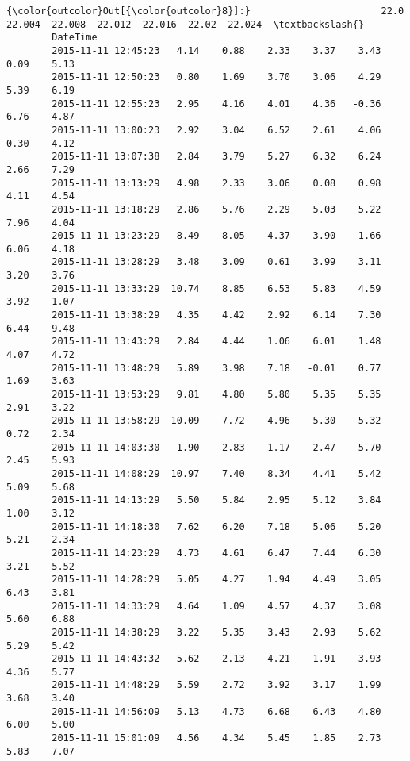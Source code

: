 \documentclass[a4paper,dvipdfmx]{jsarticle}
\begin{document}
            \begin{Verbatim}[commandchars=\\\{\}]
{\color{outcolor}Out[{\color{outcolor}8}]:}                       22.0  22.004  22.008  22.012  22.016  22.02  22.024  \textbackslash{}
        DateTime                                                                    
        2015-11-11 12:45:23   4.14    0.88    2.33    3.37    3.43   0.09    5.13   
        2015-11-11 12:50:23   0.80    1.69    3.70    3.06    4.29   5.39    6.19   
        2015-11-11 12:55:23   2.95    4.16    4.01    4.36   -0.36   6.76    4.87   
        2015-11-11 13:00:23   2.92    3.04    6.52    2.61    4.06   0.30    4.12   
        2015-11-11 13:07:38   2.84    3.79    5.27    6.32    6.24   2.66    7.29   
        2015-11-11 13:13:29   4.98    2.33    3.06    0.08    0.98   4.11    4.54   
        2015-11-11 13:18:29   2.86    5.76    2.29    5.03    5.22   7.96    4.04   
        2015-11-11 13:23:29   8.49    8.05    4.37    3.90    1.66   6.06    4.18   
        2015-11-11 13:28:29   3.48    3.09    0.61    3.99    3.11   3.20    3.76   
        2015-11-11 13:33:29  10.74    8.85    6.53    5.83    4.59   3.92    1.07   
        2015-11-11 13:38:29   4.35    4.42    2.92    6.14    7.30   6.44    9.48   
        2015-11-11 13:43:29   2.84    4.44    1.06    6.01    1.48   4.07    4.72   
        2015-11-11 13:48:29   5.89    3.98    7.18   -0.01    0.77   1.69    3.63   
        2015-11-11 13:53:29   9.81    4.80    5.80    5.35    5.35   2.91    3.22   
        2015-11-11 13:58:29  10.09    7.72    4.96    5.30    5.32   0.72    2.34   
        2015-11-11 14:03:30   1.90    2.83    1.17    2.47    5.70   2.45    5.93   
        2015-11-11 14:08:29  10.97    7.40    8.34    4.41    5.42   5.09    5.68   
        2015-11-11 14:13:29   5.50    5.84    2.95    5.12    3.84   1.00    3.12   
        2015-11-11 14:18:30   7.62    6.20    7.18    5.06    5.20   5.21    2.34   
        2015-11-11 14:23:29   4.73    4.61    6.47    7.44    6.30   3.21    5.52   
        2015-11-11 14:28:29   5.05    4.27    1.94    4.49    3.05   6.43    3.81   
        2015-11-11 14:33:29   4.64    1.09    4.57    4.37    3.08   5.60    6.88   
        2015-11-11 14:38:29   3.22    5.35    3.43    2.93    5.62   5.29    5.42   
        2015-11-11 14:43:32   5.62    2.13    4.21    1.91    3.93   4.36    5.77   
        2015-11-11 14:48:29   5.59    2.72    3.92    3.17    1.99   3.68    3.40   
        2015-11-11 14:56:09   5.13    4.73    6.68    6.43    4.80   6.00    5.00   
        2015-11-11 15:01:09   4.56    4.34    5.45    1.85    2.73   5.83    7.07   

\end{Verbatim}
\end{document}
